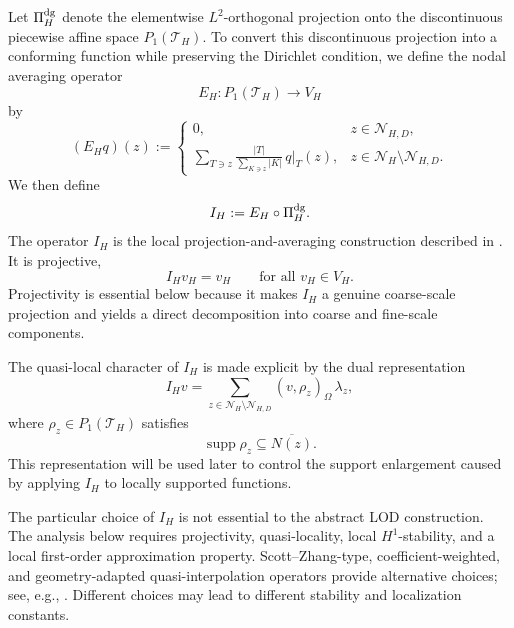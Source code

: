 Let $\Pi_H^{\rm dg}$ denote the elementwise $L^2$-orthogonal projection
onto the discontinuous piecewise affine space $P_1(\mathcal T_H)$.
To convert this discontinuous projection into a conforming function
while preserving the Dirichlet condition, we define the nodal averaging
operator
\[
  E_H:P_1(\mathcal T_H)\to V_H
\]
by
\begin{equation}
\label{eq:nodal-averaging}
  (E_Hq)(z)
  :=
  \begin{cases}
    0,
      & z\in\mathcal N_{H,D},\\[1mm]
    \displaystyle
    \sum_{T\ni z}
    \frac{|T|}
         {\sum_{K\ni z}|K|}
    \,q|_T(z),
      & z\in\mathcal N_H\setminus\mathcal N_{H,D}.
  \end{cases}
\end{equation}
We then define
\begin{equation}
\label{eq:IH}
  I_H:=E_H\circ\Pi_H^{\rm dg}.
\end{equation}
The operator $I_H$ is the local projection-and-averaging construction
described in \cite[Chapter~3]{MalqvistPeterseim2020}. It is projective,
\begin{equation}
\label{eq:IH-projective}
  I_Hv_H=v_H
  \qquad
  \text{for all }v_H\in V_H.
\end{equation}
Projectivity is essential below because it makes $I_H$ a genuine
coarse-scale projection and yields a direct decomposition into coarse
and fine-scale components.

The quasi-local character of $I_H$ is made explicit by the dual
representation
\begin{equation}
\label{eq:IH-dual-representation}
  I_Hv
  =
  \sum_{z\in\mathcal N_H\setminus\mathcal N_{H,D}}
  (v,\rho_z)_\Omega\,\lambda_z,
\end{equation}
where $\rho_z\in P_1(\mathcal T_H)$ satisfies
\[
  \operatorname{supp}\rho_z
  \subseteq
  \overline{N(z)}.
\]
This representation will be used later to control the support enlargement
caused by applying $I_H$ to locally supported functions.

\begin{remark}
\label{rem:choice-IH}
The particular choice of $I_H$ is not essential to the abstract LOD
construction. The analysis below requires projectivity, quasi-locality,
local $H^1$-stability, and a local first-order approximation property.
Scott--Zhang-type, coefficient-weighted, and geometry-adapted
quasi-interpolation operators provide alternative choices; see, e.g.,
\cite{ScottZhang1990,EngwerHenningMalqvistPeterseim2019,
PeterseimScheichl2016,HellmanMalqvist2017}.
Different choices may lead to different stability and localization
constants.
\end{remark}


